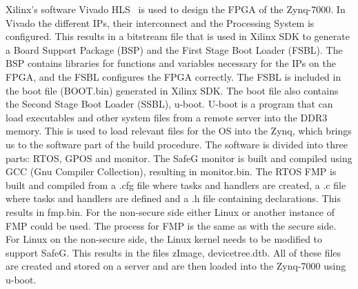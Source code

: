 Xilinx's software Vivado HLS~\cite{website:vivado} is used to design the FPGA of the Zynq-7000. In Vivado the different IPs, their interconnect and the Processing System is configured. This results in a bitstream file that is used in Xilinx SDK to generate a Board Support Package (BSP) and the First Stage Boot Loader (FSBL). The BSP contains libraries for functions and variables necessary for the IPs on the FPGA, and the FSBL configures the FPGA correctly. The FSBL is included in the boot file (BOOT.bin) generated in Xilinx SDK. The boot file also contains the Second Stage Boot Loader (SSBL), u-boot. U-boot is a program that can load executables and other system files from a remote server into the DDR3 memory. This is used to load relevant files for the OS into the Zynq, which brings us to the software part of the build procedure. The software is divided into three parts: RTOS, GPOS and monitor. The SafeG monitor is built and compiled using GCC (Gnu Compiler Collection), resulting in monitor.bin. The RTOS FMP is built and compiled from a .cfg file where tasks and handlers are created, a .c file where tasks and handlers are defined and a .h file containing declarations. This results in fmp.bin. For the non-secure side either Linux or another instance of FMP could be used. The process for FMP is the same as with the secure side. For Linux on the non-secure side, the Linux kernel needs to be modified to support SafeG. This results in the files zImage, devicetree.dtb. All of these files are created and stored on a server and are then loaded into the Zynq-7000 using u-boot.\\


